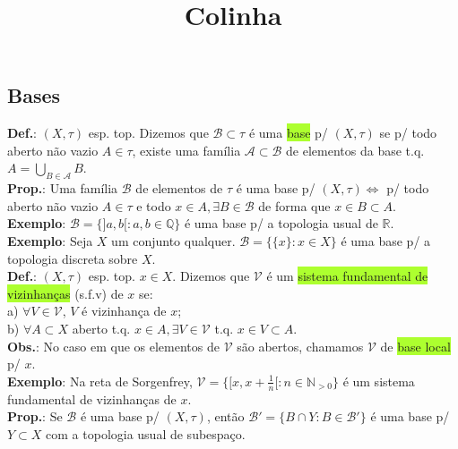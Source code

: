\documentclass{article}
\title{Colinha}
\begin{document}
\begin{landscape}

\begin{multicols}{3}

\section{Bases}

\textbf{Def.}: $(X, \tau)$ esp. top. Dizemos que $\mathcal{B} \subset \tau$ é uma \colorbox{GreenYellow}{base} p/ $(X, \tau)$ se p/ todo aberto não vazio $A \in \tau$, existe uma família $\mathcal{A} \subset \mathcal{B}$ de elementos da base t.q. $A = \bigcup_{B \in \mathcal{A}}B$.\\
\textbf{Prop.}: Uma família $\mathcal{B}$ de elementos de $\tau$ é uma base p/ $(X, \tau) \iff$ p/ todo aberto não vazio $A \in \tau$ e todo $x \in A, \exists B \in \mathcal{B}$ de forma que $x \in B \subset A$.\\
\textbf{Exemplo}: $\mathcal{B} = \{]a,b[: a,b \in \mathbb{Q}\}$ é uma base p/ a topologia usual de $\mathbb{R}$.\\
\textbf{Exemplo}: Seja $X$ um conjunto qualquer. $\mathcal{B} = \{\{x\} : x \in X\}$ é uma base p/ a topologia discreta sobre $X$.\\
\textbf{Def.}: $(X, \tau)$ esp. top. $x \in X$. Dizemos que $\mathcal{V}$ é um \colorbox{GreenYellow}{sistema fundamental de vizinhanças} (s.f.v) de $x$ se:\\
a) $\forall V \in \mathcal{V}$, $V$ é vizinhança de $x$;\\
b) $\forall A \subset X$ aberto t.q. $x \in A, \exists V \in \mathcal{V}$ t.q. $x \in V \subset A$.\\
\textbf{Obs.}: No caso em que os elementos de $\mathcal{V}$ são abertos, chamamos $\mathcal{V}$ de \colorbox{GreenYellow}{base local} p/ $x$.\\
\textbf{Exemplo}: Na reta de Sorgenfrey, $\mathcal{V} = \{[x,x+\frac{1}{n}[: n \in \mathbb{N}_{>0}\}$ é um sistema fundamental de vizinhanças de $x$.\\
\textbf{Prop.}: Se $\mathcal{B}$ é uma base p/ $(X, \tau)$, então $\mathcal{B}' = \{B \cap Y: B \in \mathcal{B}'\}$ é uma base p/ $Y \subset X$ com a topologia usual de subespaço.
\end{multicols}
\begin{center}


\end{center}
\end{landscape}
\end{document}
